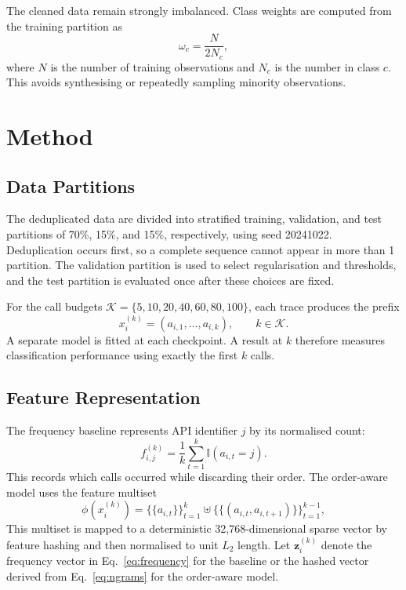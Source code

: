 \documentclass[10pt,twocolumn]{article}
\begin{document}
The cleaned data remain strongly imbalanced. Class weights are computed from the training partition as
\begin{equation}
 \omega_c=\frac{N}{2N_c},
 \label{eq:weights}
\end{equation}
where $N$ is the number of training observations and $N_c$ is the number in class $c$. This avoids synthesising or repeatedly sampling minority observations.

\section{Method}
\subsection{Data Partitions}
The deduplicated data are divided into stratified training, validation, and test partitions of 70\%, 15\%, and 15\%, respectively, using seed 20241022. Deduplication occurs first, so a complete sequence cannot appear in more than 1 partition. The validation partition is used to select regularisation and thresholds, and the test partition is evaluated once after these choices are fixed.

For the call budgets $\mathcal{K}=\{5,10,20,40,60,80,100\}$, each trace produces the prefix
\begin{equation}
 x_i^{(k)}=(a_{i,1},\ldots,a_{i,k}),\qquad k\in\mathcal{K}.
 \label{eq:prefix}
\end{equation}
A separate model is fitted at each checkpoint. A result at $k$ therefore measures classification performance using exactly the first $k$ calls.

\subsection{Feature Representation}
The frequency baseline represents API identifier $j$ by its normalised count:
\begin{equation}
 f_{i,j}^{(k)}=\frac{1}{k}\sum_{t=1}^{k}\mathbb{I}(a_{i,t}=j).
 \label{eq:frequency}
\end{equation}
This records which calls occurred while discarding their order. The order-aware model uses the feature multiset
\begin{equation}
 \phi(x_i^{(k)})=\{\!\{a_{i,t}\}\!\}_{t=1}^{k}\uplus
 \{\!\{(a_{i,t},a_{i,t+1})\}\!\}_{t=1}^{k-1},
 \label{eq:ngrams}
\end{equation}
This multiset is mapped to a deterministic 32,768-dimensional sparse vector by feature hashing and then normalised to unit $L_2$ length. Let $\mathbf{z}_i^{(k)}$ denote the frequency vector in Eq.~\eqref{eq:frequency} for the baseline or the hashed vector derived from Eq.~\eqref{eq:ngrams} for the order-aware model.
\end{document}
